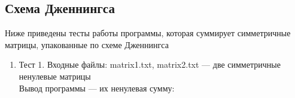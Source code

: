 \documentclass[12pt, a4paper]{article}
\begin{document}
\subsection{Схема Дженнингса}
Ниже приведены тесты работы программы, которая суммирует симметричные матрицы, 
упакованные по схеме Дженнингса
\begin{enumerate}
	\item Тест 1.
	Входные файлы: matrix1.txt, 
	matrix2.txt --- две симметричные ненулевые матрицы\\
	Вывод программы --- их ненулевая сумму:
	\begin{figure}[h]

\end{figure}
\end{enumerate}
\end{document}
